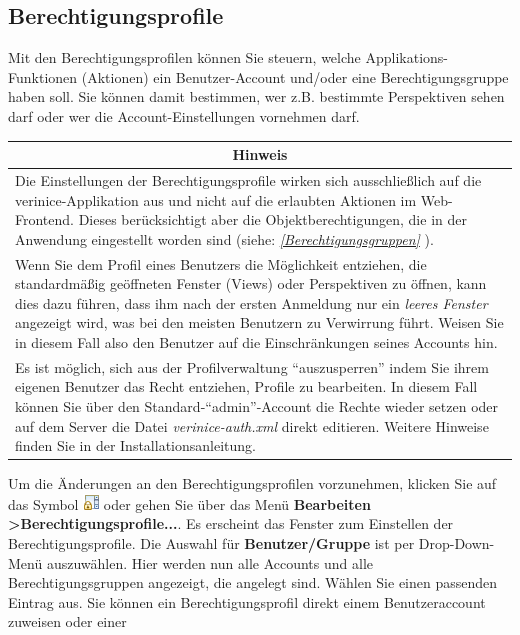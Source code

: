 \documentclass[a4paper,10pt]{book}
\begin{document}
\subsection{Berechtigungsprofile} \label{Berechtigungsprofile}
Mit den Berechtigungsprofilen können Sie steuern, welche Applikations-Funktionen (Aktionen) ein Benutzer-Account und/oder eine Berechtigungsgruppe
haben soll. Sie können damit bestimmen, wer z.B. bestimmte Perspektiven sehen darf oder wer die Account-Einstellungen vornehmen darf.
\begin{longtable}{| p{} |}
\hline
\multicolumn{1}{|c|}{\textbf{Hinweis}} \\[10pt]
\hline\hline
Die Einstellungen der Berechtigungsprofile wirken sich ausschließlich auf die verinice-Applikation aus und nicht auf die erlaubten Aktionen im Web-Frontend. Dieses berücksichtigt aber die Objektberechtigungen, die in der Anwendung eingestellt worden sind (siehe: {\em \ref{Berechtigungsgruppen} \nameref{Berechtigungsgruppen}}). \\[10pt] \hline
Wenn Sie dem Profil eines Benutzers die Möglichkeit entziehen, die standardmäßig geöffneten Fenster (Views) oder Perspektiven zu öffnen, kann dies dazu führen, dass ihm nach der ersten Anmeldung nur ein \textit{leeres Fenster} angezeigt wird, was bei den meisten Benutzern zu Verwirrung führt. Weisen Sie in diesem Fall also den Benutzer auf die Einschränkungen seines Accounts hin. \\[10pt] \hline
Es ist möglich, sich aus der Profilverwaltung ``auszusperren'' indem Sie ihrem eigenen Benutzer das Recht entziehen, Profile zu bearbeiten. In diesem Fall können Sie über den Standard-``admin''-Account die Rechte wieder setzen oder auf dem Server die Datei \textit{verinice-auth.xml} direkt editieren. Weitere Hinweise finden Sie in der Installationsanleitung. \\[10pt] \hline
\end{longtable}
Um die Änderungen an den Berechtigungsprofilen vorzunehmen, klicken Sie auf das Symbol \includegraphics[height=2ex]{Icon/Berechtigungsprofile.png}
oder gehen Sie über das Menü \textbf{Bearbeiten \textgreater Berechtigungsprofile...}. Es erscheint das Fenster zum Einstellen der Berechtigungsprofile.
Die Auswahl für \textbf{Benutzer/Gruppe} ist per Drop-Down-Menü auszuwählen. Hier werden nun alle Accounts und alle Berechtigungsgruppen angezeigt,
die angelegt sind. Wählen Sie einen passenden Eintrag aus. Sie können ein Berechtigungsprofil direkt einem Benutzeraccount zuweisen oder einer
\end{document}
